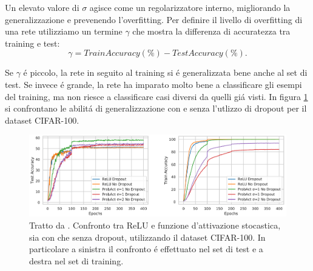 \documentclass[a4paper,12pt]{report}
\begin{document}
  Un elevato valore di $\sigma$ agisce come un regolarizzatore interno, migliorando la generalizzazione e prevenendo l'overfitting. Per definire il livello di overfitting di una rete utilizziamo un termine $\gamma$ che mostra la differenza di accuratezza tra training e test:
  \begin{equation}
   \gamma = TrainAccuracy(\%) - TestAccuracy(\%).
  \end{equation}
  
  Se $\gamma$ \'e piccolo, la rete in seguito al training si \'e generalizzata bene anche al set di test. Se invece \'e grande, la rete ha imparato molto bene a classificare gli esempi del training, ma non riesce a classificare casi diversi da quelli gi\'a visti. In figura \ref{WithWithoutDropoutpng} si confrontano le abilit\'a di generalizzazione con e senza l'utlizzo di dropout per il dataset CIFAR-100. 
  \begin{figure}[h!]
   \centering
   \includegraphics[width=\linewidth]{WithWithoutDropout.png} 
   \caption{Tratto da \cite{lee2019probact}. Confronto tra ReLU e funzione d'attivazione stocastica, sia con che senza dropout, utilizzando il dataset CIFAR-100. In particolare a sinistra il confronto \'e effettuato nel set di test e a destra nel set di training.}
  \label{WithWithoutDropoutpng}
  \end{figure} 
  
\end{document}
